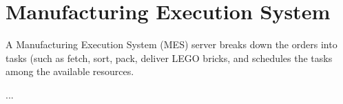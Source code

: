\chapter{Manufacturing Execution System}\label{chap:mes_server_chapter}

A Manufacturing Execution System (MES) server breaks down the orders into tasks (such as fetch, sort, pack, deliver LEGO bricks, and schedules the tasks among the available resources.

...



%



